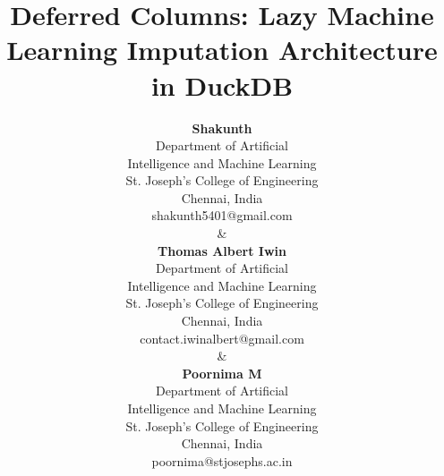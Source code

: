 \documentclass[conference]{IEEEtran}
\begin{document}
\title{\textbf{Deferred Columns: Lazy Machine Learning Imputation Architecture in DuckDB}}

\author{
\begin{tabular}{@{}c@{}c@{}c@{}}
\parbox[t]{0.32\textwidth}{\centering\normalsize\bfseries Shakunth\par\vspace{0.3em}
\footnotesize Department of Artificial\\
Intelligence and Machine Learning\\
St. Joseph's College of Engineering\\
Chennai, India\par\vspace{0.15em}
\scriptsize shakunth5401@gmail.com}
& \parbox[t]{0.32\textwidth}{\centering\normalsize\bfseries Thomas Albert Iwin\par\vspace{0.3em}
\footnotesize Department of Artificial\\
Intelligence and Machine Learning\\
St. Joseph's College of Engineering\\
Chennai, India\par\vspace{0.15em}
\scriptsize contact.iwinalbert@gmail.com}
& \parbox[t]{0.32\textwidth}{\centering\normalsize\bfseries Poornima M\par\vspace{0.3em}
\footnotesize Department of Artificial\\
Intelligence and Machine Learning\\
St. Joseph's College of Engineering\\
Chennai, India\par\vspace{0.15em}
\scriptsize poornima@stjosephs.ac.in}
\end{tabular}
}

\maketitle
\end{document}
